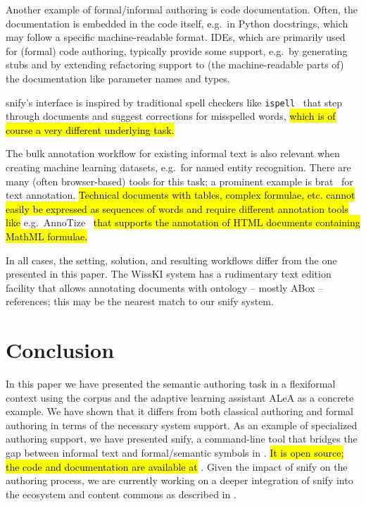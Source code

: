 \documentclass[runningheads]{llncs}
\def\edited#1{\hl{#1}}
\newcommand\ALeA{\textsf{ALeA}\xspace}
\newcommand\snify{\textsf{snify}\xspace}
\begin{document}
Another example of formal/informal authoring is code documentation.
Often, the documentation is embedded in the code itself,
e.g.\ in Python docstrings, which may follow a specific
machine-readable format.
IDEs, which are primarily used for (formal) code authoring,
typically provide some support, e.g.\ by generating stubs
and by extending refactoring support
to (the machine-readable parts of) the documentation
like parameter names and types.

\snify's interface is inspired by traditional spell checkers
like \lstinline|ispell|~\cite{ispellman}
that step through documents and suggest corrections for misspelled words,
\edited{which is of course a very different underlying task.}

The bulk annotation workflow for existing informal text is also relevant when creating
machine learning datasets, e.g.\ for named entity recognition.  There are many (often
browser-based) tools for this task; a prominent example is
\textsf{brat}~\cite{brat:on} for text annotation.
\edited{
    Technical documents with tables, complex formulae, etc. cannot
    easily be expressed as sequences of words and require different annotation
    tools like} e.g.\ \textsf{AnnoTize}~\cite{PanzerSchaefer:AnnoTize23}
\edited{
    that supports the annotation of HTML documents containing MathML formulae.
}


In all cases, the setting, solution, and resulting workflows differ from the one presented
in this paper. The WissKI system \cite{goerz2010adaptation} has a rudimentary text edition
facility that allows annotating documents with ontology -- mostly ABox -- references; this
may be the nearest match to our \snify system.

\section{Conclusion}\label{sec:conclusion}
In this paper we have presented the semantic authoring task in a flexiformal context
using the \sTeX corpus and the adaptive learning assistant \ALeA as a concrete example. We
have shown that it differs from both classical authoring and formal authoring in terms of
the necessary system support. As an example of specialized authoring support, we have
presented \snify, a command-line tool that bridges the gap between informal text and
formal/semantic symbols in \sTeX.
\edited{It is open source; the code and documentation are available at}
\cite{stextools:git}.
Given the impact of \snify on the authoring process, we are
currently working on a deeper integration of \snify into the \sTeX ecosystem and content
commons as described in . 
\end{document}
